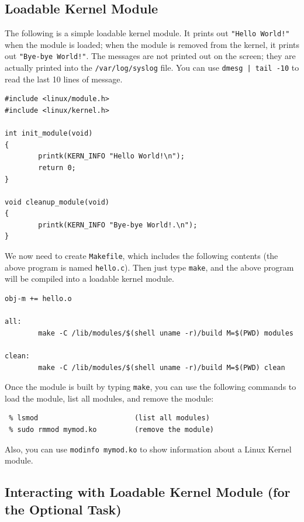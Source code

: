 \subsection{Loadable Kernel Module}

The following is a simple loadable kernel module. It prints out 
{\tt "Hello World!"} when the module is loaded; when the module
is removed from the kernel, it prints out {\tt "Bye-bye World!"}.
The messages are not printed out on the screen; they are 
actually printed into the {\tt /var/log/syslog} file. You can
use {\tt dmesg | tail -10} to read the last 10 lines of message.

\begin{Verbatim}[frame=single] 
#include <linux/module.h>
#include <linux/kernel.h>

int init_module(void)
{
        printk(KERN_INFO "Hello World!\n");
        return 0;
}

void cleanup_module(void)
{
        printk(KERN_INFO "Bye-bye World!.\n");
}
\end{Verbatim}

\noindent
We now need to create {\tt Makefile}, which includes the following
contents (the above program is named {\tt hello.c}). Then 
just type {\tt make}, and the above program will be compiled
into a loadable kernel module.


\begin{Verbatim}[frame=single] 
obj-m += hello.o

all:
        make -C /lib/modules/$(shell uname -r)/build M=$(PWD) modules

clean:
        make -C /lib/modules/$(shell uname -r)/build M=$(PWD) clean
\end{Verbatim} 



\noindent
Once the module is built by typing {\tt make}, you can use the following commands to 
load the module, list all modules, and remove the module:

\begin{Verbatim}[frame=single] 
 % sudo insmod mymod.ko        (inserting a module)
 % lsmod                       (list all modules)
 % sudo rmmod mymod.ko         (remove the module)
\end{Verbatim} 

Also, you can use {\tt modinfo mymod.ko} to show information about a 
Linux Kernel module.


\subsection{Interacting with Loadable Kernel Module (for the Optional Task)}

